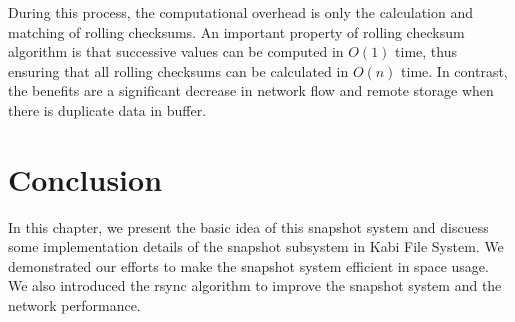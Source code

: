     During this process, the computational overhead is only the calculation and matching of rolling checksums. An important property of rolling checksum algorithm is that successive values can be computed in $O(1)$ time, thus ensuring that all rolling checksums can be calculated in $O(n)$ time. In contrast, the benefits are a significant decrease in network flow and remote storage when there is duplicate data in buffer.

\section{Conclusion}

   In this chapter, we present the basic idea of this snapshot system and discuess some implementation details of the snapshot subsystem in Kabi File System. We demonstrated our efforts to make the snapshot system efficient in space usage. We also introduced the rsync algorithm to improve the snapshot system and the network performance.
